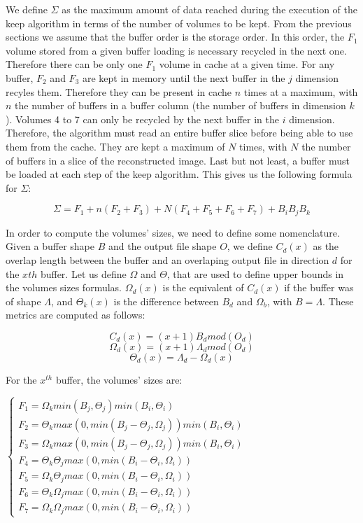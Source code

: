 \documentclass[conference]{IEEEtran}
\begin{document}
We define $\Sigma$ as the maximum amount of data reached during the execution
of the keep algorithm in terms of the number of volumes to be kept. From the
previous sections we assume that the buffer order is the storage order. In this
order, the $F_1$ volume stored from a given buffer loading is necessary recycled
in the next one. Therefore there can be only one $F_1$ volume in cache at a
given time. For any buffer, $F_2$ and $F_3$ are kept in memory until the next
buffer in the $j$ dimension recyles them. Therefore they can be present in cache
$n$ times at a maximum, with $n$ the number of buffers in a buffer column (the
number of buffers in dimension $k$). Volumes 4 to 7 can only be recycled by the
next buffer in the $i$ dimension. Therefore, the algorithm must read an entire
buffer slice before being able to use them from the cache. They are kept a
maximum of $N$ times, with $N$ the number of buffers in a slice of the
reconstructed image. Last but not least, a buffer must be loaded at each step of
the keep algorithm. This gives us the following formula for $\Sigma$:

$$\Sigma = F_1 + n(F_2 + F_3) + N(F_4 + F_5 + F_6 + F_7) + B_iB_jB_k$$

In order to compute the volumes' sizes, we need to define some nomenclature.
Given a buffer shape $B$ and the output file shape $O$, we define $C_d(x)$ as
the overlap length between the buffer and an overlaping output file in direction
$d$ for the $x{th}$ buffer. Let us define $\Omega$ and $\Theta$, that are used
to define upper bounds in the volumes sizes formulas. $\Omega_d(x)$ is the
equivalent of $C_d(x)$ if the buffer was of shape $\Lambda$, and $\Theta_k(x)$
is the difference between $B_d$ and $\Omega_b$, with $B=\Lambda$.
These metrics are computed as follows:

$$C_d(x) = (x+1)B_d mod(O_d)$$
$$\Omega_d(x) = (x+1)\Lambda_d mod(O_d)$$
$$\Theta_d(x) = \Lambda_d - \Omega_d(x)$$

For the $x^{th}$ buffer, the volumes' sizes are:

$\begin{cases}
F_1 = \Omega_k min(B_j, \Theta_j) min(B_i, \Theta_i) \\
F_2 = \Theta_k max(0, min(B_j - \Theta_j, \Omega_j)) min(B_i, \Theta_i) \\
F_3 = \Omega_k max(0, min(B_j - \Theta_j, \Omega_j)) min(B_i, \Theta_i) \\
F_4 = \Theta_k \Theta_j max(0, min(B_i-\Theta_i, \Omega_i)) \\
F_5 = \Omega_k \Theta_j max(0, min(B_i-\Theta_i, \Omega_i)) \\
F_6 = \Theta_k \Omega_j max(0, min(B_i-\Theta_i, \Omega_i)) \\
F_7 = \Omega_k \Omega_j max(0, min(B_i-\Theta_i, \Omega_i))
\end{cases}$
\end{document}
